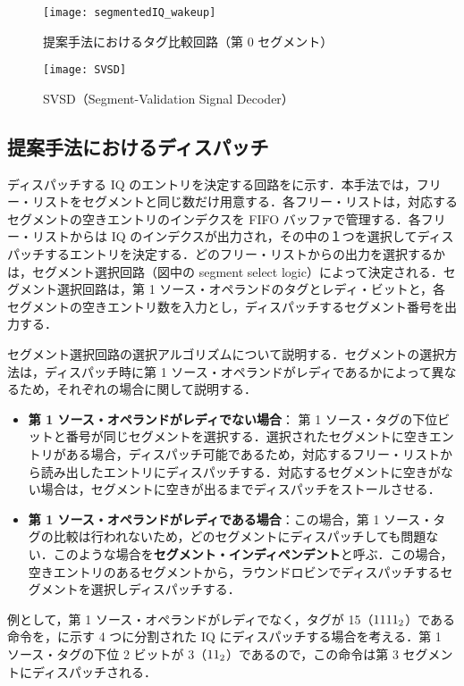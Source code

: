 \begin{figure}[htb]
  \centering
  \texttt{[image: segmentedIQ\_wakeup]}
  \caption{提案手法におけるタグ比較回路（第 0 セグメント）}
  \label{fig:segmentedIQ_wakeup}
\end{figure}

\begin{figure}[htb]
  \centering
  \texttt{[image: SVSD]}
  \caption{SVSD（Segment-Validation Signal Decoder）}
  \label{fig:SVSD}
\end{figure}

\subsection{提案手法におけるディスパッチ}
ディスパッチする IQ のエントリを決定する回路をに示す．本手法では，フリー・リストをセグメントと同じ数だけ用意する．各フリー・リストは，対応するセグメントの空きエントリのインデクスを FIFO バッファで管理する．各フリー・リストからは IQ のインデクスが出力され，その中の１つを選択してディスパッチするエントリを決定する．どのフリー・リストからの出力を選択するかは，セグメント選択回路（図中の segment select logic）によって決定される．セグメント選択回路は，第 1 ソース・オペランドのタグとレディ・ビットと，各セグメントの空きエントリ数を入力とし，ディスパッチするセグメント番号を出力する．

セグメント選択回路の選択アルゴリズムについて説明する．セグメントの選択方法は，ディスパッチ時に第 1 ソース・オペランドがレディであるかによって異なるため，それぞれの場合に関して説明する．
\begin{itemize}
  \item \textbf{第 1 ソース・オペランドがレディでない場合}： 第 1 ソース・タグの下位ビットと番号が同じセグメントを選択する．選択されたセグメントに空きエントリがある場合，ディスパッチ可能であるため，対応するフリー・リストから読み出したエントリにディスパッチする．対応するセグメントに空きがない場合は，セグメントに空きが出るまでディスパッチをストールさせる．
  \item \textbf{第 1 ソース・オペランドがレディである場合}：この場合，第 1 ソース・タグの比較は行われないため，どのセグメントにディスパッチしても問題ない．このような場合を\textbf{セグメント・インディペンデント}と呼ぶ．この場合，空きエントリのあるセグメントから，ラウンドロビンでディスパッチするセグメントを選択しディスパッチする．
\end{itemize}
例として，第 1 ソース・オペランドがレディでなく，タグが 15（${\rm 1111_2}$）である命令を，に示す 4 つに分割された IQ にディスパッチする場合を考える．第 1 ソース・タグの下位 2 ビットが 3（${\rm 11_2}$）であるので，この命令は第 3 セグメントにディスパッチされる．　

